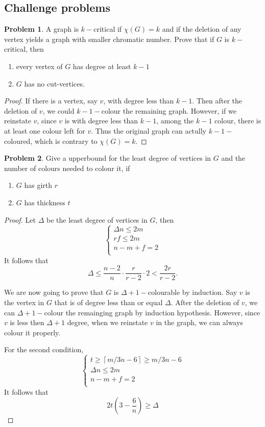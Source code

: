 \documentclass[a4paper,11pt]{article}%
\theoremstyle{remark}
\theoremstyle{definition}
\newtheorem{problem}{Problem}[subsection]
\begin{document}
\subsection{Challenge problems}
\begin{problem}
    A graph is $k-$critical if $\chi(G)=k$ and if the deletion of any vertex yields a graph with 
    smaller chromatic number. 
    Prove that if $G$ is $k-$critical, then 
    \begin{enumerate}
        \item every vertex of $G$ has degree at least $k-1$
        \item $G$ has no cut-vertices.
    \end{enumerate}
\end{problem}
\begin{proof}
    If there is a vertex, say $v$, with degree less than $k-1$. Then after the deletion of $v$, we could $k-1-$colour the 
    remaining graph. However, if we reinstate $v$, since $v$ is with degree less than $k-1$, among the $k-1$ colour, there 
    is at least one colour left for $v$. Thus the original graph can actully $k-1-$coloured, which is contrary to $\chi(G)=k$.

\end{proof}
\begin{problem}
    Give a upperbound for the least degree of vertices in $G$ and the number of colours needed to colour it,
    if 
    \begin{enumerate}
        \item $G$ has girth $r$
        \item $G$ has thickness $t$
    \end{enumerate}
    \begin{proof}
       Let $\Delta$ be the least degree of vertices in $G$, then 
       \[\begin{cases}
        \Delta n\leq 2m\\
        rf\leq 2m\\
        n-m+f=2\\
       \end{cases}\] 
       It follows that 
       \[\Delta\leq\frac{n-2}{n}\cdot\frac{r}{r-2}\cdot 2<\frac{2r}{r-2}.\] 

       We are now going to prove that $G$ is $\Delta+1-$colourable by induction.
       Say $v$ is the vertex in $G$ that is of degree less than or equal $\Delta$.
       After the deletion of $v$, we can $\Delta+1-$colour the remainging graph by induction hypothesis.
       However, since $v$ is less then $\Delta +1$ degree, when we reinstate $v$ in the graph, we can always colour it properly. 

       For the second condition, 
       \[\begin{cases}
        t\geq \left\lceil m/3n-6\right\rceil \geq m/3n-6\\
        \Delta n\leq 2m\\
        n-m+f=2\\
       \end{cases}\]
       It follows that 
       \[2t(3-\frac{6}{n})\geq\Delta\]
    \end{proof}
\end{problem}
\end{document}
